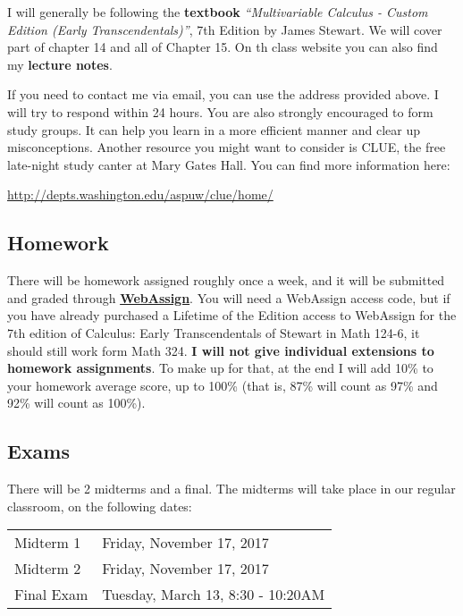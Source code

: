 \documentclass[11pt]{article}
\begin{document}
I will generally be following the \textbf{textbook} \emph{``Multivariable Calculus - Custom Edition (Early Transcendentals)''}, 7th Edition by James Stewart. We will cover part of chapter 14 and all of Chapter 15. On th class website you can also find my \textbf{lecture notes}.

 If you need to contact me via email, you can use the address provided above. I will try to respond within 24 hours. You are also strongly encouraged to form study groups. It can help you learn in a more efficient manner and clear up misconceptions. Another resource you might want to consider is CLUE, the free late-night study canter at Mary Gates Hall. You can find more information here: \begin{center}
 \url{http://depts.washington.edu/aspuw/clue/home/}
 \end{center}
\vspace{1mm}
\subsection*{Homework}

There will be homework assigned roughly once a week, and it will be submitted and graded through \href{https://www.webassign.net/washington/login.html}{\textbf{WebAssign}}. You will need a WebAssign access code, but if you have already purchased a Lifetime of the Edition access to WebAssign for the 7th edition of Calculus: Early Transcendentals of Stewart in Math 124-6, it should still work form Math 324. \textbf{I will not give individual extensions to homework assignments}. To make up for that, at the end I will add 10\% to your homework average score, up to 100\% (that is, 87\% will count as 97\% and 92\% will count as 100\%).

\vspace{1mm}
\subsection*{Exams}

There will be 2 midterms and a final. The midterms will take place in our regular classroom, on the following dates:\\
\vspace{0.1 in}
\begin{center}
\begin{tabular}{l l}
  Midterm 1 & {\color{red}Friday, November 17, 2017}\\
  Midterm 2 & {\color{red}Friday, November 17, 2017}\\
  Final Exam & Tuesday, March 13, 	8:30 - 10:20AM
\end{tabular}
\end{center}
\end{document}
